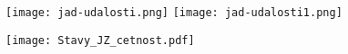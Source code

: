 \begin{figure}[ht!]
	\texttt{[image: jad-udalosti.png]}
	\texttt{[image: jad-udalosti1.png]}
\end{figure}

\begin{figure}[h!]
    \centering
    \texttt{[image: Stavy\_JZ\_cetnost.pdf]}
\end{figure}


\clearpage


\begin{comment}
    
Základní bezpečnostní funkce:
\begin{enumerate}
    \item umožňovat v případě potřeby okamžitě a bezpečně odstavit jaderný reaktor a udržovat jej v podkritickém stavu
    \item zabránit nekontrolovanému rozvoji štěpné řetězové reakce,
    \item fyzikálně znemožnit vznik kritického a nadkritického stavu mimo vnitřní prostor jaderného reaktoru
    \item  zajišťovat odvod tepla vytvářeného jaderným palivem a technologickými systémy a
    \item zajistit stínění a zabránit úniku radioaktivní látky a šíření ionizujícího záření do
životního prostředí
\end{enumerate}


\subsubsection{Zajištění podkritičnosti}

\begin{itemize}

\item Lze uvažovat všechny existujı́cı́ bezpečnostnı́ systémy (v úrovni
ochrany do hloubky 3a)
\item Při využitı́ každého systému musı́ být uvažována nejvı́ce závažná jednoduchá porucha (navı́c k poruše v rámci metodiky)
\item Na začátku přechodového procesu se obvykle uplatnı́ systém rychlého odstavenı́ reaktoru
\item Následně udrženı́ stabilizovaného podkritického stavu
\end{itemize}
\subsubsection{Zajištění odvodu tepla}


\end{comment}
